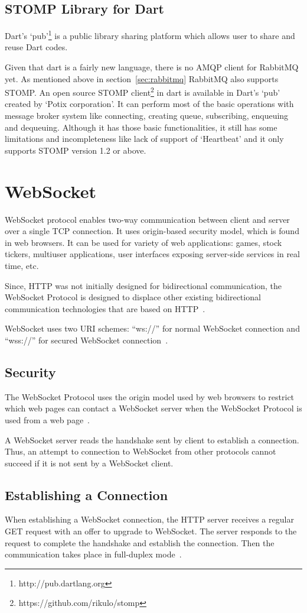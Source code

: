   \subsection{STOMP Library for Dart}
  \label{subsec:stompForDart}
  Dart's ‘pub’\footnote{http://pub.dartlang.org} is a public library sharing platform which allows user to share and reuse Dart codes.

  Given that dart is a fairly new language, there is no AMQP client for RabbitMQ yet. As mentioned above in section~\ref{sec:rabbitmq} RabbitMQ also supports STOMP. An open source STOMP client\footnote{https://github.com/rikulo/stomp} in dart is available in Dart's ‘pub’ created by ‘Potix corporation’. It can perform most of the basic operations with message broker system like connecting, creating queue, subscribing, enqueuing and dequeuing. Although it has those basic functionalities, it still has some limitations and incompleteness like lack of support of ‘Heartbeat’ and it only supports STOMP version 1.2 or above.


\section{WebSocket}
  WebSocket protocol enables two-way communication between client and server over a single TCP connection. It uses origin-based security model, which is found in web browsers. It can be used for variety of web applications: games, stock tickers, multiuser applications, user interfaces exposing server-side services in real time, etc.~\cite{rfc6455}

  Since, HTTP was not initially designed for bidirectional communication, the WebSocket Protocol is designed to displace other existing bidirectional communication technologies that are based on HTTP~\cite{rfc6455}.

  WebSocket uses two URI schemes: “ws://” for normal WebSocket connection and “wss://” for secured WebSocket connection~\cite{rfc6455}.

\subsection{Security}
  The WebSocket Protocol uses the origin model used by web browsers to restrict which web pages can contact a WebSocket server when the WebSocket Protocol is used from a web page~\cite{rfc6455}.

   A WebSocket server reads the handshake sent by client to establish a connection. Thus, an attempt to connection to WebSocket from other protocols cannot succeed if it is not sent by a WebSocket client.~\cite{rfc6455}

\subsection{Establishing a Connection}
  When establishing a WebSocket connection, the HTTP server receives a regular GET request with an offer to upgrade to WebSocket. The server responds to the request to complete the handshake and establish the connection. Then the communication takes place in full-duplex mode~\cite{rfc6455}.
